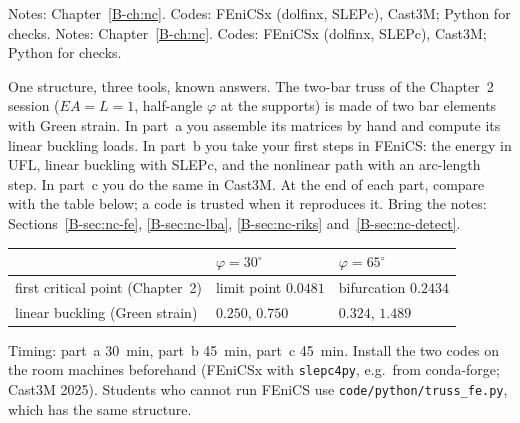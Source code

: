 \clearpage
\renewcommand{\sessionchapter}{Chapter 3 -- From continuum to discrete: numerical methods}
\setcounter{spart}{0}
\setcounter{algorithm}{0}
\ifanswers
{}
  {Notes: Chapter~\ref{B-ch:nc}. Codes: FEniCSx (dolfinx, SLEPc), Cast3M; Python for checks.}
\else
{}
  {Notes: Chapter~\ref{B-ch:nc}. Codes: FEniCSx (dolfinx, SLEPc), Cast3M; Python for checks.}
\fi

\noindent
One structure, three tools, known answers. The two-bar truss of the Chapter~2 session
($EA = L = 1$, half-angle $\varphi$ at the supports) is made of two bar elements with Green
strain. In part~a you assemble its matrices by hand and compute its linear buckling loads.
In part~b you take your first steps in FEniCS: the energy in UFL, linear buckling with SLEPc,
and the nonlinear path with an arc-length step. In part~c you do the same in Cast3M. At the
end of each part, compare with the table below; a code is trusted when it reproduces it.
Bring the notes: Sections~\ref{B-sec:nc-fe}, \ref{B-sec:nc-lba}, \ref{B-sec:nc-riks}
and~\ref{B-sec:nc-detect}.

\begin{center}
\begin{tabular}{@{}lll@{}}
  \toprule
  & $\varphi = 30^\circ$ & $\varphi = 65^\circ$ \\
  \midrule
  first critical point (Chapter~2) & limit point $0.0481$ & bifurcation $0.2434$ \\
  linear buckling (Green strain)   & $0.250$, $0.750$     & $0.324$, $1.489$ \\
  \bottomrule
\end{tabular}
\end{center}

\begin{instructor}
Timing: part~a 30~min, part~b 45~min, part~c 45~min. Install the two codes on the room
machines beforehand (FEniCSx with \texttt{slepc4py}, e.g.\ from conda-forge; Cast3M 2025). Students
who cannot run FEniCS use \texttt{code/python/truss\_fe.py}, which has the same structure.
\end{instructor}

